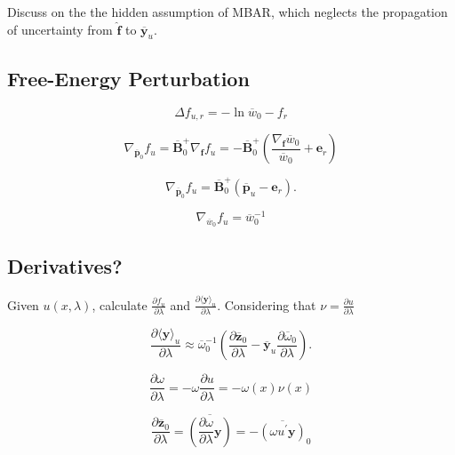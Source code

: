 \documentclass[journal=jctcce,manuscript=article,layout=twocolumn]{achemso}
\newcommand{\mt}[1]{\boldsymbol{\mathbf{#1}}}   %
\newcommand{\vt}[1]{\boldsymbol{\mathbf{#1}}}   %
\newcommand{\diff}[2]{\frac{\partial #1}{\partial #2}} %
\newcommand{\avg}[1]{\overline{#1}}             %
\begin{document}
Discuss on the the hidden assumption of MBAR, which neglects the propagation of uncertainty from $\hat{\vt f}$ to $\avg{\vt y}_u$.

\subsection{Free-Energy Perturbation}

\begin{equation*}
\Delta f_{u,r} = -\ln \avg{w}_0 - f_r
\end{equation*}

\begin{equation*}
\nabla_{\avg{\vt p}_0}{f_u} = \avg{\mt B}_0^+  \nabla_{\vt f}{f_u} = -\avg{\mt B}_0^+  \left({\frac{\nabla_{\vt f} \avg{w}_0}{\avg{w}_0}} + {\vt e}_r \right)
\end{equation*}

\begin{equation*}
\nabla_{\avg{\vt p}_0}{f_u} = \avg{\mt B}_0^+  (\avg{\vt p}_u - {\vt e}_r).
\end{equation*}


\begin{equation*}
\nabla_{\avg{w}_0}{f_u} = \avg{w}_0^{-1}
\end{equation*}


\subsection{Derivatives?}

Given $u(x,\lambda)$, calculate $\frac{\partial f_u}{\partial \lambda}$ and $\frac{\partial \langle \vt y \rangle_u}{\partial \lambda}$. Considering that $\nu = \diff{u}{\lambda}$

\begin{equation*}
\diff{\langle \vt y \rangle_u}{\lambda} \approx \avg{\omega}_0^{-1} \left( \diff{\avg{\vt z}_0}{\lambda} - \avg{\vt y}_u \diff{\avg{\omega}_0}{\lambda} \right).
\end{equation*}

\begin{equation*}
\diff{\omega}{\lambda} = -\omega \diff{u}{\lambda} = -\omega(x) \nu(x)
\end{equation*}


\begin{equation*}
\diff{\avg{\vt z}_0}{\lambda} = \avg{\left( \diff{\omega}{\lambda} \vt y \right)} = -\avg{(\omega u^\prime \vt y)}_0
\end{equation*}
\end{document}

